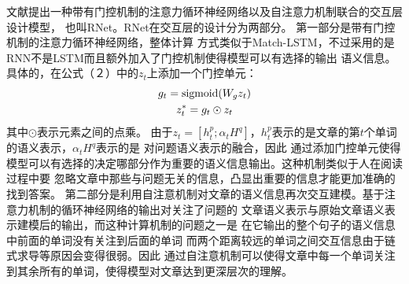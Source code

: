 文献\cite{RNet}提出一种带有门控机制的注意力循环神经网络以及自注意力机制联合的交互层设计模型，
也叫RNet。RNet在交互层的设计分为两部分。
第一部分是带有门控机制的注意力循环神经网络，整体计算
方式类似于Match-LSTM，不过采用的是RNN不是LSTM而且额外加入了门控机制使得模型可以有选择的输出
语义信息。具体的，在公式（２）中的$z_t$上添加一个门控单元：
\begin{gather}
    g_t=\text{sigmoid}(W_gz_t)\notag \\
    z_t^{*}=g_t\odot z_t
\end{gather}
其中$\odot$表示元素之间的点乘。
由于$z_t=[h_t^p;\alpha_tH^q]$，$h_t^p$表示的是文章的第$t$个单词的语义表示，$\alpha_tH^q$表示的是
对问题语义表示的融合，因此
通过添加门控单元使得模型可以有选择的决定哪部分作为重要的语义信息输出。这种机制类似于人在阅读过程中要
忽略文章中那些与问题无关的信息，凸显出重要的信息才能更加准确的找到答案。
第二部分是利用自注意机制对文章的语义信息再次交互建模。基于注意力机制的循环神经网络的输出对关注了问题的
文章语义表示与原始文章语义表示建模后的输出，而这种计算机制的问题之一是
在它输出的整个句子的语义信息中前面的单词没有关注到后面的单词
而两个距离较远的单词之间交互信息由于链式求导等原因会变得很弱。因此
通过自注意机制可以使得文章中每一个单词关注到其余所有的单词，使得模型对文章达到更深层次的理解。


